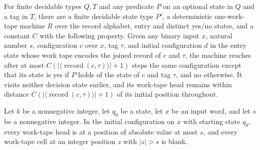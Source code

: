 \begin{theorem}
\label{Turing.exists_recordTestTM}
\leanok
{}
For finite decidable types $Q,T$ and any predicate $P$ on an optional state in $Q$ and a
tag in $T$, there are a finite decidable state type $P'$, a deterministic one-work-tape
machine $R$ over the record alphabet, entry and distinct yes/no states, and a constant
$C$ with the following property. Given any binary input $x$, natural number $s$,
configuration $c$ over $x$, tag $\tau$, and initial configuration $d$ in the entry state
whose work tape encodes the joined record of $c$ and $\tau$, the machine reaches after
at most $C(|\langle\operatorname{record}(c,\tau)\rangle|+1)$ steps the same
configuration except that its state is yes if $P$ holds of the state of $c$ and tag
$\tau$, and no otherwise. It visits neither decision state earlier, and its work-tape
head remains within distance $C(|\langle\operatorname{record}(c,\tau)\rangle|+1)$ of its
initial position throughout.
\end{theorem}

\begin{theorem}
\label{Turing.Cfg.inWindow_init}
\leanok
{}
Let $k$ be a nonnegative integer, let $q_0$ be a state, let $x$ be an input word, and
let $s$ be a nonnegative integer. In the initial configuration on $x$ with starting
state $q_0$, every work-tape head is at a position of absolute value at most $s$, and
every work-tape cell at an integer position $z$ with $|z|>s$ is blank.
\end{theorem}
